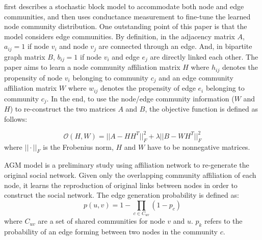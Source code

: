 \cite{jin2015combined} first describes a stochastic block model to accommodate both node and edge communities, and then uses conductance measurement to fine-tune the learned node community distribution. One outstanding point of this paper is that the model considers edge communities. By definition, in the adjacency matrix $A$, $a_{ij} = 1$ if node $v_i$ and node $v_j$ are connected through an edge. And, in bipartite graph matrix $B$, $b_{ij} = 1$ if node $v_i$ and edge $e_j$ are directly linked each other. The paper aims to learn a node community affiliation matrix $H$ where $h_{ij}$ denotes the propensity of node $v_i$ belonging to community $c_j$ and an edge community affiliation matrix $W$ where $w_{ij}$ denotes the propensity of edge $e_i$ belonging to community $c_j$. In the end, to use the node/edge community information ($W$ and $H$) to re-construct the two matrices $A$ and $B$, the objective function is defined as follows:

\begin{equation} 
	\mathcal{O}(H,W) = ||A-HH^T||^2_F + \lambda ||B-WH^T||^2_F
\end{equation}
where $||\cdot||_F$ is the Frobenius norm, $H$ and $W$ have to be nonnegative matrices.

AGM model \cite{yang2012community} is a preliminary study using affiliation network to re-generate the original social network. Given only the overlapping community affiliation of each node, it learns the  reproduction of original links between nodes in order to construct the social network. The edge generation probability is defined as: 
\begin{equation}
p(u,v) = 1-\prod_{c \in C_{uv}} (1-p_c)
\end{equation}
where $C_{uv}$ are a set of shared communities for node $v$ and $u$. $p_k$ refers to the probability of an edge forming between two nodes in the community $c$. 

